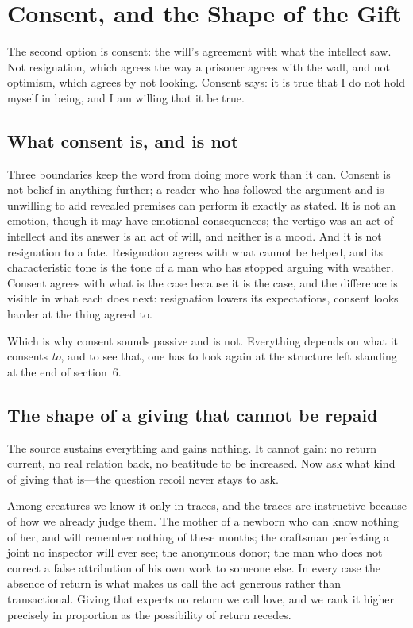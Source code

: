 \section{Consent, and the Shape of the Gift}

The second option is consent: the will's agreement with what the intellect saw. Not resignation, which agrees the way a prisoner agrees with the wall, and not optimism, which agrees by not looking. Consent says: it is true that I do not hold myself in being, and I am willing that it be true.

\subsection{What consent is, and is not}

Three boundaries keep the word from doing more work than it can. Consent is not belief in anything further; a reader who has followed the argument and is unwilling to add revealed premises can perform it exactly as stated. It is not an emotion, though it may have emotional consequences; the vertigo was an act of intellect and its answer is an act of will, and neither is a mood. And it is not resignation to a fate. Resignation agrees with what cannot be helped, and its characteristic tone is the tone of a man who has stopped arguing with weather. Consent agrees with what is the case because it is the case, and the difference is visible in what each does next: resignation lowers its expectations, consent looks harder at the thing agreed to.

Which is why consent sounds passive and is not. Everything depends on what it consents \emph{to}, and to see that, one has to look again at the structure left standing at the end of section~6.

\subsection{The shape of a giving that cannot be repaid}

The source sustains everything and gains nothing. It cannot gain: no return current, no real relation back, no beatitude to be increased. Now ask what kind of giving that is---the question recoil never stays to ask.

Among creatures we know it only in traces, and the traces are instructive because of how we already judge them. The mother of a newborn who can know nothing of her, and will remember nothing of these months; the craftsman perfecting a joint no inspector will ever see; the anonymous donor; the man who does not correct a false attribution of his own work to someone else. In every case the absence of return is what makes us call the act generous rather than transactional. Giving that expects no return we call love, and we rank it higher precisely in proportion as the possibility of return recedes.

